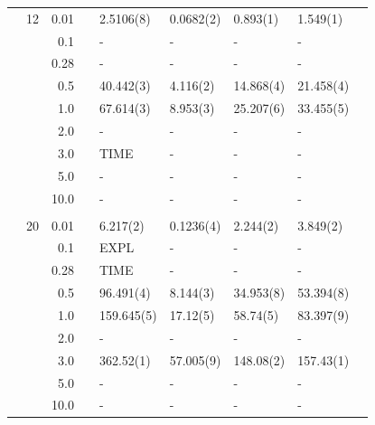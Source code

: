 \begin{table}
\begin{tabularx}{\textwidth}{R{1cm}rrcR{2.3cm}R{2.3cm}R{2.3cm}R{2.3cm}R{1cm}}
		&12 & 0.01 && 2.5106(8) & 0.0682(2) & 0.893(1) & 1.549(1) \\
		&& 0.1 && - & - & - & - \\
		&& 0.28 && - & - & - & - \\
		&& 0.5 && 40.442(3) & 4.116(2) & 14.868(4) & 21.458(4) \\
		&& 1.0 && 67.614(3) & 8.953(3) & 25.207(6) & 33.455(5) \\
		&& 2.0 && - & - & - & -\\
		&& 3.0 && TIME & - & - & - \\ 
		&& 5.0 && - & - & - & -\\
		&& 10.0 && - & - & - & -\\
		\hdashline \\
		
		&20 & 0.01 && 6.217(2) & 0.1236(4) & 2.244(2) & 3.849(2) \\
		&& 0.1 && EXPL & - & - & - \\
		&& 0.28 && TIME & - & - & - \\
		&& 0.5 && 96.491(4) & 8.144(3) & 34.953(8) & 53.394(8) \\
		&& 1.0 && 159.645(5) & 17.12(5) & 58.74(5) & 83.397(9) \\
		&& 2.0 && - & - & - & -\\
		&& 3.0 && 362.52(1) & 57.005(9) & 148.08(2) & 157.43(1) \\ 
		&& 5.0 && - & - & - & -\\
		&& 10.0 && - & - & - & -\\
		\hline \hline
	\end{tabularx}
\end{table} 

